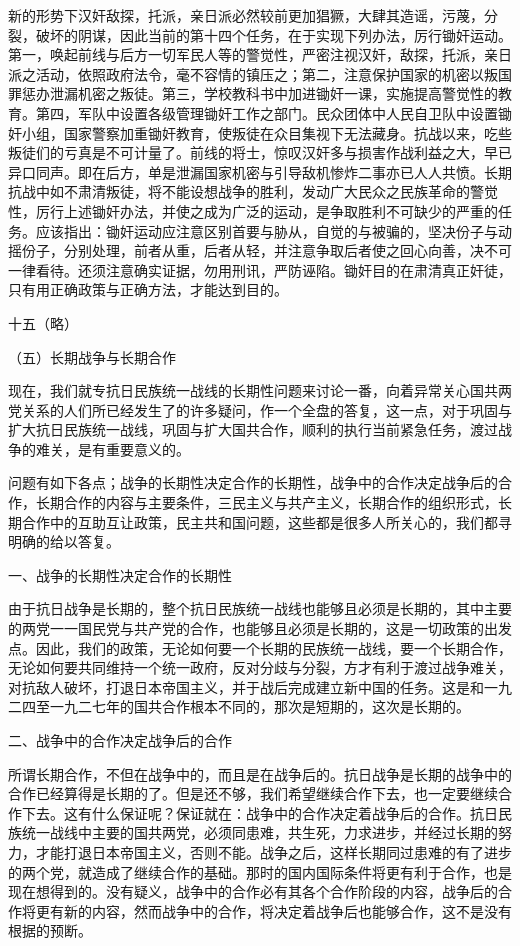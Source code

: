 新的形势下汉奸敌探，托派，亲日派必然较前更加猖獗，大肆其造谣，污蔑，分裂，破坏的阴谋，因此当前的第十四个任务，在于实现下列办法，厉行锄奸运动。第一，唤起前线与后方一切军民人等的警觉性，严密注视汉奸，敌探，托派，亲日派之活动，依照政府法令，毫不容情的镇压之；第二，注意保护国家的机密以叛国罪惩办泄漏机密之叛徒。第三，学校教科书中加进锄奸一课，实施提高警觉性的教育。第四，军队中设置各级管理锄奸工作之部门。民众团体中人民自卫队中设置锄奸小组，国家警察加重锄奸教育，使叛徒在众目集视下无法藏身。抗战以来，吃些叛徒们的亏真是不可计量了。前线的将士，惊叹汉奸多与损害作战利益之大，早已异口同声。即在后方，单是泄漏国家机密与引导敌机惨炸二事亦已人人共愤。长期抗战中如不肃清叛徒，将不能设想战争的胜利，发动广大民众之民族革命的警觉性，厉行上述锄奸办法，并使之成为广泛的运动，是争取胜利不可缺少的严重的任务。应该指出：锄奸运动应注意区别首要与胁从，自觉的与被骗的，坚决份子与动摇份子，分别处理，前者从重，后者从轻，并注意争取后者使之回心向善，决不可一律看待。还须注意确实证据，勿用刑讯，严防诬陷。锄奸目的在肃清真正奸徒，只有用正确政策与正确方法，才能达到目的。

十五（略）

（五）长期战争与长期合作

现在，我们就专抗日民族统一战线的长期性问题来讨论一番，向着异常关心国共两党关系的人们所已经发生了的许多疑问，作一个全盘的答复，这一点，对于巩固与扩大抗日民族统一战线，巩固与扩大国共合作，顺利的执行当前紧急任务，渡过战争的难关，是有重要意义的。

问题有如下各点；战争的长期性决定合作的长期性，战争中的合作决定战争后的合作，长期合作的内容与主要条件，三民主义与共产主义，长期合作的组织形式，长期合作中的互助互让政策，民主共和国问题，这些都是很多人所关心的，我们都寻明确的给以答复。

一、战争的长期性决定合作的长期性

由于抗日战争是长期的，整个抗日民族统一战线也能够且必须是长期的，其中主要的两党一一国民党与共产党的合作，也能够且必须是长期的，这是一切政策的出发点。因此，我们的政策，无论如何要一个长期的民族统一战线，要一个长期合作，无论如何要共同维持一个统一政府，反对分歧与分裂，方才有利于渡过战争难关，对抗敌人破坏，打退日本帝国主义，并于战后完成建立新中国的任务。这是和一九二四至一九二七年的国共合作根本不同的，那次是短期的，这次是长期的。

二、战争中的合作决定战争后的合作

所谓长期合作，不但在战争中的，而且是在战争后的。抗日战争是长期的战争中的合作已经算得是长期的了。但是还不够，我们希望继续合作下去，也一定要继续合作下去。这有什么保证呢？保证就在：战争中的合作决定着战争后的合作。抗日民族统一战线中主要的国共两党，必须同患难，共生死，力求进步，并经过长期的努力，才能打退日本帝国主义，否则不能。战争之后，这样长期同过患难的有了进步的两个党，就造成了继续合作的基础。那时的国内国际条件将更有利于合作，也是现在想得到的。没有疑义，战争中的合作必有其各个合作阶段的内容，战争后的合作将更有新的内容，然而战争中的合作，将决定着战争后也能够合作，这不是没有根据的预断。

